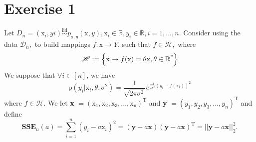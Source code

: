 \documentclass[12pt,a4paper]{article}
\begin{document}
\section*{Exercise 1}
Let  $D_n={(\mathrm{x}_i,yi) \overset{\text{iid}}{\sim} p_{\mathrm{x},y}(\mathrm{x},y) ,  \mathrm{x}_i \in \mathbb{R}, y_i \in \mathbb{R},   i= 1, ... , n}.$ Consider using the data $\mathscr{D}_n,$ to build mappings  $f: \mathrm{x} \to Y$,  such that $f\in \mathscr{H},$ where
\begin{equation}
	\mathscr{H} := \left\lbrace  \mathrm{x}  \to f(\mathrm{x}) =  \theta \mathrm{x} , \vspace{0.4pt}  \theta \in \mathbb{R}^{\text{*}} \right\rbrace
	\label{eq:1}
\end{equation}
We suppose that $\forall i \in [n]$, we have 
\begin{equation}
		\mathrm{p}(y_i|\mathrm{x}_i, \theta, \sigma^2) = \frac{1}{\sqrt{2 \pi \sigma^2  }} e^{ \frac{-1}{ 2\sigma^2} (y_i - f(\mathrm{x}_i))^2 }
		\label{eq:2}
\end{equation}
where $f \in \mathscr{H} $.  We let \textbf{x} $ = (\mathrm{x_1}, \mathrm{x_2},\mathrm{x_3}, ..., \mathrm{x_n})^{\text{T}} $ and \textbf{y} $ = (y_1, y_2, y_3,  ... , y_n)^{\text{T}} $ and define 
\begin{equation}
	\textbf{SSE}_n(a) =  \sum_{i =1}^{n} (y_i - a \mathrm{x}_i)^2 =   (\textbf{y} - a\textbf{x})    (\textbf{y} - a\textbf{x}) ^ {\text{T}} = || \textbf{y} - a\textbf{x} ||_2^2.  
	\label{eq:3}
\end{equation}
\end{document}
